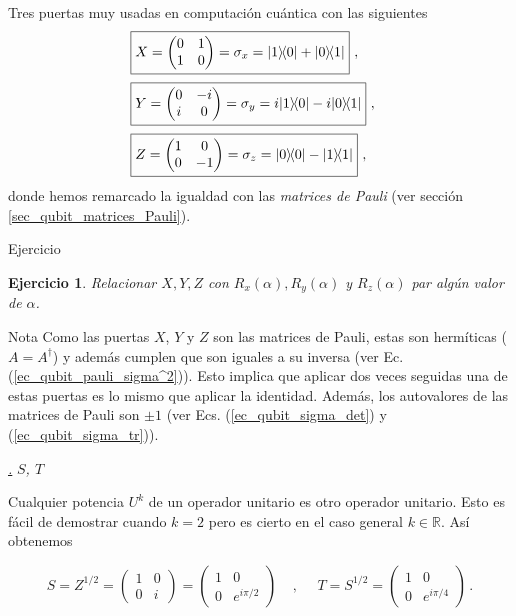 \documentclass[a4paper,11pt]{book} %
\newtheorem{ejercicio_contador}{Ejercicio}
\newcommand{\Ejercicio}[1]{
		\begin{mybox_gray}{Ejercicio} 
			\begin{ejercicio_contador}
				 #1 
			\end{ejercicio_contador} 
		\end{mybox_gray}
	}
\numberwithin{equation}{chapter}
\def\lp{\left(}
\def\rp{\right)}
\newcommand{\ketbra}[2]{| #1\rangle \! \langle #2|}
\def\subsubiContadorIt{\par\addtocounter{subsubsection}{1}\underline{\it\thesubsubsection.}\hskip0.5cm \setcounter{subsubsubsectionIt}{0}}
\newcommand{\SubsubiIt}[1]{
		\subsubiContadorIt \textit{#1}
	}
\newcounter{subsubsubsectionIt}[subsubsection]
\begin{document}
Tres puertas muy usadas en computación cuántica con las siguientes
\begin{align}
&\boxed{X = \lp  \begin{matrix}0&1\\1&0\end{matrix} \rp = \sigma_x = \ketbra{1}{0} + \ketbra{0}{1}}~, ~~~  \label{ec_puertas_simples_X} \\ \rule{0mm}{7mm}
&\boxed{Y = \lp \begin{matrix}0&-i\\i&0\end{matrix} \rp = \sigma_y  =  i \ketbra{1}{0} - i \ketbra{0}{1}}~, ~~~ \label{ec_puertas_simples_Y}\\ \rule{0mm}{7mm}
&\boxed{Z = \lp  \begin{matrix}1&0\\0&-1\end{matrix} \rp = \sigma_z = \ketbra{0}{0} - \ketbra{1}{1}}  ~, ~~~ \label{ec_puertas_simples_Z}
\end{align}
donde hemos remarcado la igualdad con las \textit{matrices de Pauli} (ver sección \ref{sec_qubit_matrices_Pauli}).

\Ejercicio{Relacionar  $X,Y,Z$ con   $R_x(\alpha),R_y(\alpha)$ y $R_z(\alpha)$ par algún valor de $\alpha$.}
            
	\begin{mybox_blue}{Nota}
	Como las puertas $X$, $Y$ y $Z$ son las matrices de Pauli, estas son hermíticas ($A = A^\dagger$) y 
	además cumplen que son iguales a su inversa (ver Ec. (\ref{ec_qubit_pauli_sigma^2})). 
	Esto implica que aplicar dos veces seguidas una de estas puertas es lo mismo que aplicar la identidad. 
	Además, los autovalores de las matrices de Pauli son $\pm 1$ (ver Ecs. (\ref{ec_qubit_sigma_det}) y (\ref{ec_qubit_sigma_tr})).
	\end{mybox_blue}


            \SubsubiIt{$S$, $T$}

Cualquier potencia $U^k$ de un operador unitario es otro operador unitario. Esto es fácil de demostrar cuando $k=2$ pero es cierto en el caso general $k\in{\mathbb R}$. Así obtenemos

	\begin{equation}
	\boxed{S = Z^{1/2} =  \lp\begin{matrix}1&0\\0&i\end{matrix}\rp = \lp\begin{matrix}1&0\\0&e^{i\pi/2}\end{matrix} \rp}
	~~~~~,~~~~~~ 
	\boxed{T = S^{1/2} = \lp \begin{matrix} 1&0 \\ 0 & e^{i\pi/4} \end{matrix} \rp} \, .
	\end{equation}
            
\end{document}

